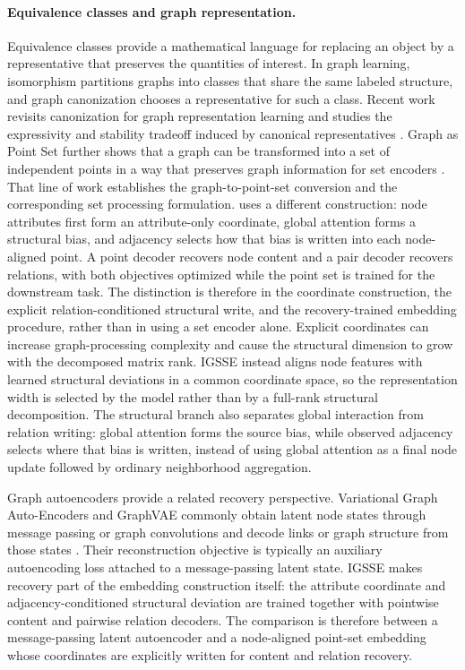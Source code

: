 \paragraph{Equivalence classes and graph representation.}
Equivalence classes provide a mathematical language for replacing an object by a
representative that preserves the quantities of interest.  In graph learning,
isomorphism partitions graphs into classes that share the same labeled structure,
and graph canonization chooses a representative for such a class.  Recent work
revisits canonization for graph representation learning and studies the
expressivity and stability tradeoff induced by canonical representatives
\cite{dong2024canonization}.  Graph as Point Set further shows that a graph can
be transformed into a set of independent points in a way that preserves graph
information for set encoders \cite{wang2024graphpointset}.  That line of work
establishes the graph-to-point-set conversion and the corresponding set
processing formulation.  \method{} uses a different construction: node
attributes first form an attribute-only coordinate, global attention forms a
structural bias, and adjacency selects how that bias is written into each
node-aligned point.  A point decoder recovers node content and a pair decoder
recovers relations, with both objectives optimized while the point set is
trained for the downstream task.  The distinction is therefore in the
coordinate construction, the explicit relation-conditioned structural write,
and the recovery-trained embedding procedure, rather than in using a set
encoder alone.
Explicit coordinates can increase graph-processing complexity and cause the
structural dimension to grow with the decomposed matrix rank.  IGSSE instead
aligns node features with learned structural deviations in a common coordinate
space, so the representation width is selected by the model rather than by a
full-rank structural decomposition.
The structural branch also separates global interaction from relation writing:
global attention forms the source bias, while observed adjacency selects where
that bias is written, instead of using global attention as a final node update
followed by ordinary neighborhood aggregation.

Graph autoencoders provide a related recovery perspective.  Variational Graph
Auto-Encoders and GraphVAE commonly obtain latent node states through message
passing or graph convolutions and decode links or graph structure from those
states \cite{kipf2016vgae,simonyan2018graphvae}.  Their reconstruction objective
is typically an auxiliary autoencoding loss attached to a message-passing
latent state.  IGSSE makes recovery part of the embedding construction itself:
the attribute coordinate and adjacency-conditioned structural deviation are
trained together with pointwise content and pairwise relation decoders.  The
comparison is therefore between a message-passing latent autoencoder and a
node-aligned point-set embedding whose coordinates are explicitly written for
content and relation recovery.

